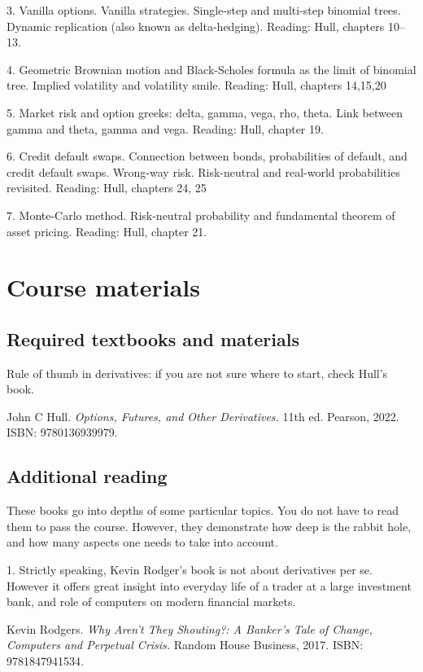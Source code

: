 \documentclass[a4paper,14pt]{extarticle}
\begin{document}
3. Vanilla options. Vanilla strategies. Single-step and multi-step binomial trees. Dynamic
replication (also known as delta-hedging).
Reading: Hull, chapters 10--13.

4. Geometric Brownian motion and Black-Scholes formula as the limit of binomial tree. Implied
volatility and volatility smile.
Reading: Hull, chapters 14,15,20

5. Market risk and option greeks: delta, gamma, vega, rho, theta. Link between gamma and theta,
gamma and vega.
Reading: Hull, chapter 19.

6. Credit default swaps. Connection between bonds, probabilities of default, and credit default
swaps. Wrong-way risk. Risk-neutral and real-world probabilities revisited.
Reading: Hull, chapters 24, 25

7. Monte-Carlo method. Risk-neutral probability and fundamental theorem of asset pricing.
Reading: Hull, chapter 21.

\section*{Course materials}

\subsection*{Required textbooks and materials}
Rule of thumb in derivatives: if you are not sure where to start, check Hull’s book.

John C Hull. \textit{Options, Futures, and Other Derivatives.} 11th ed. Pearson, 2022. ISBN:
9780136939979.

\subsection*{Additional reading}

These books go into depths of some particular topics. You do not have to read them to pass the
course. However, they demonstrate how deep is the rabbit hole, and how many aspects one
needs to take into account.

1. Strictly speaking, Kevin Rodger’s book is not about derivatives per se. However it offers great
insight into everyday life of a trader at a large investment bank, and role of computers on modern
financial markets.

Kevin Rodgers. \textit{Why Aren't They Shouting?: A Banker’s Tale of Change, Computers and Perpetual
Crisis.} Random House Business, 2017. ISBN: 9781847941534.
\end{document}
